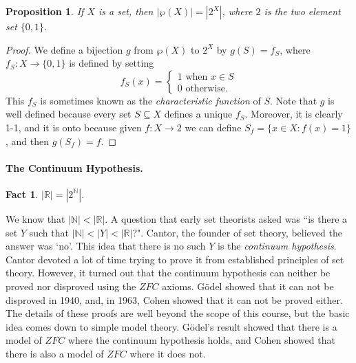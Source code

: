 \documentclass{article}
\theoremstyle{plain}
\newtheorem{proposition}[theorem]{Proposition}{\bfseries}{\itshape}
\newtheorem{fact}[theorem]{Fact}{\bfseries}{\upshape}
\newcommand{\bN}{\mathbb{N}}
\newcommand{\bR}{\mathbb{R}}
\begin{document}
\begin{proposition}\label{P:power}
If $X$ is a set, then $|\wp(X)|=|2^X|$, where $2$ is the two element set $\{0,1\}$.
\end{proposition}
\begin{proof}
We define a bijection $g$ from $\wp(X)$ to $2^X$ by $g(S) = f_S$, where $f_S:X\to \{0,1\}$ is defined by setting 
\[f_S(x)=\begin{cases} 1 \text{ when $x\in S$} \\
0 \text{ otherwise.}\end{cases}\]
This $f_S$ is sometimes known as the \emph{characteristic function} of $S$. Note that $g$ is well defined because every set $S\subseteq X$ defines a unique $f_S$. Moreover, it is clearly 1-1, and it is onto because given $f:X\to 2$ we can define $S_f=\{x\in X: f(x)=1\}$, and then $g(S_f)=f$.
\end{proof}

\paragraph{The Continuum Hypothesis.}

\begin{fact}\label{Fa:R}
$|\bR|=|2^\bN|$.
\end{fact}

We know that $|\bN|<|\bR|$. A question that early set theorists asked was ``is there a set $Y$ such that $|\bN|<|Y|<|\bR|$?". Cantor, the founder of set theory, believed the answer was `no'. This idea that there is no such $Y$ is the \emph{continuum hypothesis}. Cantor devoted a lot of time trying to prove it from established principles of set theory. However, it turned out that the continuum hypothesis can neither be proved nor disproved using the $ZFC$ axioms. G\"odel showed that it can not be disproved in 1940, and, in 1963, Cohen showed that it can not be proved either. The details of these proofs are well beyond the scope of this course, but the basic idea comes down to simple model theory. G\"odel's result showed that there is a model of $ZFC$ where the continuum hypothesis holds, and Cohen showed that there is also a model of $ZFC$ where it does not.  
\end{document}
